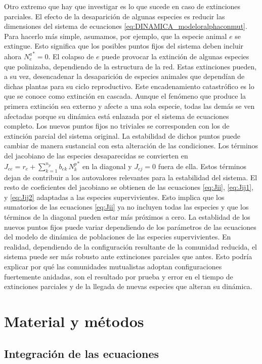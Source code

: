 Otro extremo que hay que investigar es lo que sucede en caso de extinciones parciales. El efecto de la desaparición de algunas especies es reducir las dimensiones del sistema de ecuaciones \ref{eq:DINAMICA_modeloralphaconmut}. Para hacerlo más simple, asumamos, por ejemplo, que la especie animal $e$ se extingue. Esto significa que los posibles puntos fijos del sistema deben incluir ahora ${N_e^a}^* = 0$. El colapso de $e$ puede provocar la extinción de algunas especies que polinizaba, dependiendo de la estructura de la red. Estas extinciones pueden, a su vez, desencadenar la desaparición de especies animales que dependían de dichas plantas para su ciclo reproductivo. Este encadenamiento catastrófico es lo que se conoce como extinción en cascada. Aunque el fenómeno que produce la primera extinción sea externo y afecte a una sola especie, todas las demás se ven afectadas porque su dinámica está enlazada por el sistema de ecuaciones completo. Los nuevos puntos fijos no triviales se corresponden con los de extinción parcial del sistema original. La estabilidad de dichos puntos puede cambiar de manera sustancial con esta alteración de las condiciones. Los términos del jacobiano de las especies desaparecidas se convierten en $J_{ee} = r_e + \sum_{k =1}^{n_p }b_{ek}\,{N_k^p}^*$ en la diagonal y $J_{ej} = 0$ fuera de ella. Estos términos dejan de contribuir a los autovalores relevantes para la estabilidad del sistema. El resto de coeficientes del jacobiano se obtienen de las ecuaciones \ref{eq:Jii}, \ref{eq:Jij1}, y \ref{eq:Jij2} adaptadas a las especies supervivientes. Esto implica que los sumatorios de las ecuaciones \ref{eq:Jii} ya no incluyen todas las especies y que los términos de la diagonal pueden estar más próximos a cero. La establidad de los nuevos puntos fijos puede variar dependiendo de los parámetros de las ecuaciones del modelo de dinámica de poblaciones de las especies supervivientes. En realidad, dependiendo de la configuración resultante de la comunidad reducida, el sistema puede ser más robusto ante extinciones parciales que antes. Esto podría explicar por qué las comunidades mutualistas adoptan configuraciones fuertemente anidadas, son el resultado por prueba y error en el tiempo de extinciones parciales y de la llegada de nuevas especies que alteran su dinámica.   

\section{Material y métodos}

\subsection{Integración de las ecuaciones}
\label{DINAMINCA_NumSim}

